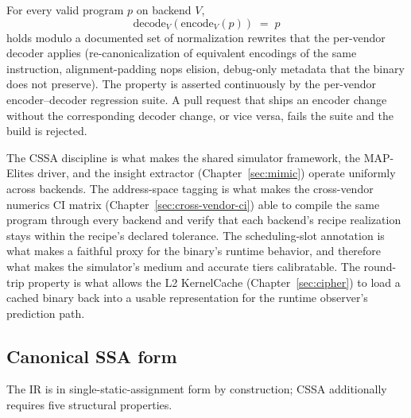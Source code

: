 \begin{property}
\label{prop:ir003-roundtrip}
For every valid  program $p$ on backend $V$,
\[
    \mathrm{decode}_V(\mathrm{encode}_V(p)) \;=\; p
\]
holds modulo a documented set of normalization rewrites that the per-vendor decoder applies (re-canonicalization of equivalent encodings of the same instruction, alignment-padding nops elision, debug-only metadata that the binary does not preserve).
The property is asserted continuously by the per-vendor encoder--decoder regression suite.
A pull request that ships an encoder change without the corresponding decoder change, or vice versa, fails the suite and the build is rejected.
\end{property}

The CSSA discipline is what makes the shared simulator framework, the MAP-Elites driver, and the insight extractor (Chapter~\ref{sec:mimic}) operate uniformly across backends.
The address-space tagging is what makes the cross-vendor numerics CI matrix (Chapter~\ref{sec:cross-vendor-ci}) able to compile the same  program through every backend and verify that each backend's recipe realization stays within the recipe's declared tolerance.
The scheduling-slot annotation is what makes  a faithful proxy for the binary's runtime behavior, and therefore what makes the simulator's medium and accurate tiers calibratable.
The round-trip property is what allows the L2 KernelCache (Chapter~\ref{sec:cipher}) to load a cached binary back into a usable  representation for the runtime observer's prediction path.

\subsection{Canonical SSA form}
\label{sec:ir003-cssa}

The IR is in single-static-assignment form by construction; CSSA additionally requires five structural properties.

